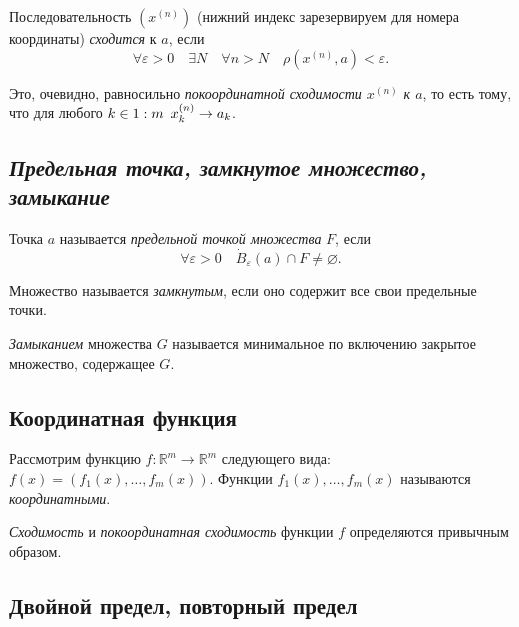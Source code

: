 \begin{definition}
	Последовательность  \((x^{(n)})\) (нижний индекс зарезервируем для номера координаты) \textit{сходится} к \(a\), если \[
		\forall \varepsilon > 0 \quad \exists N \quad \forall n > N \quad \rho(x^{(n)}, a) < \varepsilon.
	\]
	
	Это, очевидно, равносильно \textit{покоординатной сходимости \(x^{(n)}\) к \(a\)}, то есть тому, что для любого \(k \in 1 : m \enskip x_k^{(n)} \to a_k\).
\end{definition}

\subsection{\itshape Предельная точка, замкнутое множество, замыкание}

\begin{definition}
	Точка  \(a\) называется \textit{предельной точкой множества} \(F\), если \[
		\forall \varepsilon > 0 \quad \dot B_\varepsilon (a) \cap F \neq \varnothing.
	\]
	
	Множество называется \textit{замкнутым}, если оно содержит все свои предельные точки.
	
	\textit{Замыканием} множества \(G\) называется минимальное по включению закрытое множество, содержащее \(G\).
\end{definition}

\subsection{Координатная функция}

\begin{definition}
	Рассмотрим функцию \(f \colon \mathbb{R}^m \to \mathbb{R}^m\) следующего вида: \(f(x) = (f_1 (x), \ldots, f_m (x))\). Функции \(f_1 (x), \ldots, f_m (x)\) называются \textit{координатными}.
\end{definition}

\begin{remark}
	\textit{Сходимость} и \textit{покоординатная сходимость} функции \(f\) определяются привычным образом.
\end{remark}

\subsection{Двойной предел, повторный предел}

